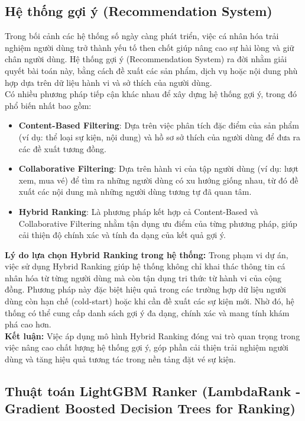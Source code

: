 \subsection{Hệ thống gợi ý (Recommendation System)}

\indent \indent Trong bối cảnh các hệ thống số ngày càng phát triển, việc cá nhân hóa trải nghiệm người dùng trở thành yếu tố then chốt giúp nâng cao sự hài lòng và giữ chân người dùng. Hệ thống gợi ý (Recommendation System) ra đời nhằm giải quyết bài toán này, bằng cách đề xuất các sản phẩm, dịch vụ hoặc nội dung phù hợp dựa trên dữ liệu hành vi và sở thích của người dùng. \\
\indent Có nhiều phương pháp tiếp cận khác nhau để xây dựng hệ thống gợi ý, trong đó phổ biến nhất bao gồm:

\begin{itemize}
    \item[-] \textbf{Content-Based Filtering}: Dựa trên việc phân tích đặc điểm của sản phẩm (ví dụ: thể loại sự kiện, nội dung) và hồ sơ sở thích của người dùng để đưa ra các đề xuất tương đồng.
    \item[-] \textbf{Collaborative Filtering}: Dựa trên hành vi của tập người dùng (ví dụ: lượt xem, mua vé) để tìm ra những người dùng có xu hướng giống nhau, từ đó đề xuất các nội dung mà những người dùng tương tự đã quan tâm.
    \item[-] \textbf{Hybrid Ranking}: Là phương pháp kết hợp cả Content-Based và Collaborative Filtering nhằm tận dụng ưu điểm của từng phương pháp, giúp cải thiện độ chính xác và tính đa dạng của kết quả gợi ý.
\end{itemize}

\indent \textbf{Lý do lựa chọn Hybrid Ranking trong hệ thống:} Trong phạm vi dự án, việc sử dụng Hybrid Ranking giúp hệ thống không chỉ khai thác thông tin cá nhân hóa từ từng người dùng mà còn tận dụng tri thức từ hành vi của cộng đồng. Phương pháp này đặc biệt hiệu quả trong các trường hợp dữ liệu người dùng còn hạn chế (cold-start) hoặc khi cần đề xuất các sự kiện mới. Nhờ đó, hệ thống có thể cung cấp danh sách gợi ý đa dạng, chính xác và mang tính khám phá cao hơn. \\
\indent \textbf{Kết luận:} Việc áp dụng mô hình Hybrid Ranking đóng vai trò quan trọng trong việc nâng cao chất lượng hệ thống gợi ý, góp phần cải thiện trải nghiệm người dùng và tăng hiệu quả tương tác trong nền tảng đặt vé sự kiện.


\subsection{Thuật toán LightGBM Ranker (LambdaRank - Gradient Boosted Decision Trees for Ranking)}


